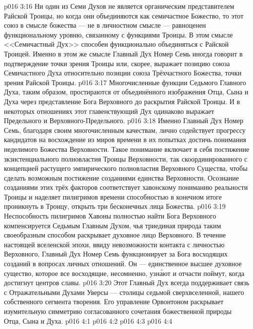 \vs p016 3:16 Ни один из Семи Духов не является органическим представителем Райской Троицы, но когда они объединяются как семичастное Божество, то этот союз в смысле божества --- не в личностном смысле --- равноценен функциональному уровню, связанному с функциями Троицы. В этом смысле <<Семичастный Дух>> способен функционально объединяться с Райской Троицей. Именно в этом же смысле Главный Дух Номер Семь иногда говорит в подтверждение точки зрения Троицы или, скорее, выражает позицию союза Семичастного Духа относительно позиции союза Трёхчастного Божества, точки зрения Райской Троицы.
\vs p016 3:17 Многочисленные функции Седьмого Главного Духа, таким образом, простираются от объединённого изображения  Отца, Сына и Духа через представление  Бога Верховного до раскрытия  Райской Троицы. И в некоторых отношениях этот главенствующий Дух одинаково выражает  Предельного и Верховного\hyp{}Предельного.
\vs p016 3:18 Именно Главный Дух Номер Семь, благодаря своим многочисленным качествам, лично содействует прогрессу кандидатов на восхождение из миров времени в их попытках достичь понимания неделимого Божества Верховности. Такое понимание включает в себя постижение зкзистенциального полновластия Троицы Верховности, так скоординированного с концепцией растущего эмпирического полновластия Верховного Существа, чтобы сделать возможным постижение созданиями единства Верховности. Осознание созданиями этих трёх факторов соответствует хавонскому пониманию реальности Троицы и наделяет пилигримов времени способностью в конечном итоге проникнуть в Троицу, открыть три бесконечных лица Божества.
\vs p016 3:19 Неспособность пилигримов Хавоны полностью найти Бога Верховного компенсируется Седьмым Главным Духом, чья триединая природа таким своеобразным способом раскрывает духовное лицо Верховного. В течение настоящей вселенской эпохи, ввиду невозможности контакта с личностью Верховного, Главный Дух Номер Семь функционирует за Бога восходящих созданий в вопросах личных отношений. Он --- единственное высшее духовное существо, которое все восходящие, несомненно, узн\'ают и отчасти поймут, когда достигнут центров славы.
\vs p016 3:20 Этот Главный Дух всегда поддерживает связь с Отражательными Духами Уверсы --- столицы седьмой сверхвселенной, нашего собственного сегмента творения. Его управление Орвонтоном раскрывает изумительную симметрию согласованного сочетания божественной природы Отца, Сына и Духа.
\vs p016 4:1 
\vs p016 4:2 
\vs p016 4:3 
\vs p016 4:4 
